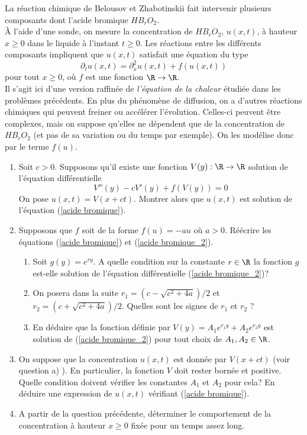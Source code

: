 \begin{exo}
    La réaction chimique de Belousov et Zhabotinskii fait intervenir plusieurs composants dont l'acide bromique $HB_rO_2$.\\
    À l'aide d'une sonde, on mesure la concentration de $HB_rO_2$, $u(x,t)$, à hauteur $x\ge 0$ dans le liquide à l'instant $t\ge 0$.
    Les réactions entre les différents composants impliquent que $u(x,t)$ satisfait une équation du type
    \begin{equation}
        \partial_{t}u(x,t)=\partial_{x}^{2}u(x,t)+f(u(x,t)) \label{acide bromique}
    \end{equation}
    pour tout $x\ge 0$, où $f$ est une fonction $\R \rightarrow \R $.\\
    Il s'agit ici d'une version raffinée de {\it l'équation de la chaleur} étudiée dans les problèmes précédents.
    En plus du phénomène de diffusion, on a d'autres réactions chimiques qui peuvent freiner ou accélérer l'évolution. Celles-ci peuvent être complexes, mais on suppose qu'elles ne dépendent que de la concentration de $HB_rO_2$ (et pas de sa variation ou du temps par exemple). On les modélise donc par le terme $f(u)$.
    \begin{enumerate}
        \item Soit $c>0$. Supposons qu'il existe une fonction $V(y): \R \rightarrow \R $ solution de l'équation différentielle
        \begin{equation}
            V''(y)-cV'(y)+f(V(y))=0 \label{acide bromique_2}
        \end{equation}
        On pose $u(x,t)=V(x+ct)$. Montrer alors que $u(x,t)$ est solution de l'équation (\ref{acide bromique}).
        \item Supposons que $f$ soit de la forme $f(u)=-au$ où $a>0$. Réécrire les équations (\ref{acide bromique}) et (\ref{acide bromique_2}).
        \begin{enumerate}
            \item Soit $g(y)=e^{ry}$. A quelle condition sur la constante $r\in\R$ la fonction $g$ est-elle solution de l'équation différentielle (\ref{acide bromique_2})?
            \item On posera dans la suite $r_1=(c-\sqrt{c^2+4a})/2$ et $r_2=(c+\sqrt{c^2+4a})/2$. Quelles sont les signes de $r_{1}$ et $r_{2}$ ?
            \item En déduire que la fonction définie par $V(y)=A_1e^{r_1y}+A_2e^{r_2y}$ est solution de (\ref{acide bromique_2}) pour tout choix de $A_1,A_2\in\R$.
        \end{enumerate}
        \item On suppose que la concentration $u(x,t)$ est donnée par $V(x+ct)$ (voir question a) ). En particulier, la fonction $V$ doit rester bornée et positive. Quelle condition doivent vérifier les constantes $A_1$ et $A_2$ pour cela? En déduire une expression de $u(x,t)$ vérifiant (\ref{acide bromique}).
        \item A partir de la question précédente, déterminer le comportement de la concentration à hauteur $x\ge 0$ fixée  pour un temps assez long.
    \end{enumerate}
\end{exo}


\finchapitre

